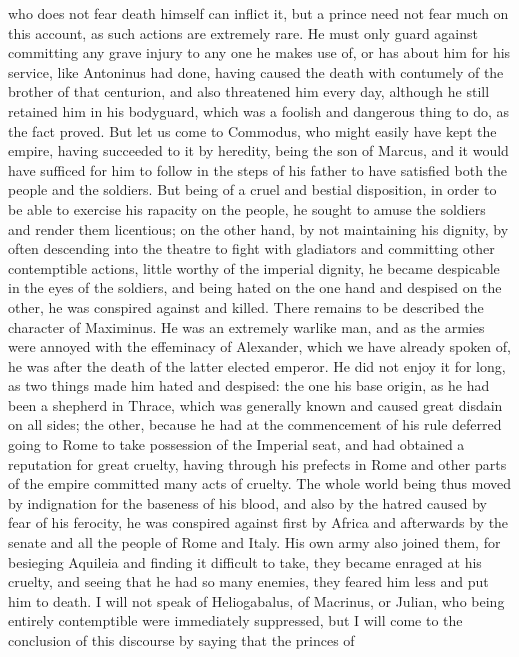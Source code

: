 \documentclass[12pt,letterpaper]{memoir}
\begin{document}
who does not fear death himself can inflict it, but a prince need not
fear much on this account, as such actions are extremely rare. He must
only guard against committing any grave injury to any one he makes use
of, or has about him for his service, like Antoninus had done, having
caused the death with contumely of the brother of that centurion, and
also threatened him every day, although he still retained him in his
bodyguard, which was a foolish and dangerous thing to do, as the fact
proved. But let us come to Commodus, who might easily have kept the
empire, having succeeded to it by heredity, being the son of Marcus,
and it would have sufficed for him to follow in the steps of his father
to have satisfied both the people and the soldiers. But being of a
cruel and bestial disposition, in order to be able to exercise his
rapacity on the people, he sought to amuse the soldiers and render
them licentious; on the other hand, by not maintaining his dignity,
by often descending into the theatre to fight with gladiators and
committing other contemptible actions, little worthy of the imperial
dignity, he became despicable in the eyes of the soldiers, and being
hated on the one hand and despised on the other, he was conspired
against and killed. There remains to be described the character of
Maximinus. He was an extremely warlike man, and as the armies were
annoyed with the effeminacy of Alexander, which we have already spoken
of, he was after the death of the latter elected emperor. He did not
enjoy it for long, as two things made him hated and despised: the
one his base origin, as he had been a shepherd in Thrace, which was
generally known and caused great disdain on all sides; the other,
because he had at the commencement of his rule deferred going to Rome
to take possession of the Imperial seat, and had obtained a reputation
for great cruelty, having through his prefects in Rome and other parts
of the empire committed many acts of cruelty. The whole world being
thus moved by indignation for the baseness of his blood, and also by
the hatred caused by fear of his ferocity, he was conspired against
first by Africa and afterwards by the senate and all the people of Rome
and Italy. His own army also joined them, for besieging Aquileia and
finding it difficult to take, they became enraged at his cruelty, and
seeing that he had so many enemies, they feared him less and put him to
death. I will not speak of Heliogabalus, of Macrinus, or Julian, who
being entirely contemptible were immediately suppressed, but I will
come to the conclusion of this discourse by saying that the princes of
\end{document}
